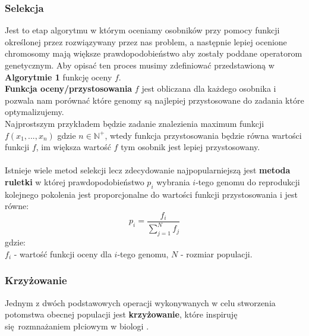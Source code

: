 \documentclass{article}
\begin{document}
\subsubsection{Selekcja}
Jest to etap algorytmu w którym oceniamy osobników przy pomocy funkcji określonej przez
rozwiązywany przez nas problem, a następnie lepiej ocenione chromosomy mają większe 
prawdopodobieństwo aby zostały poddane operatorom genetycznym.
Aby opisać ten proces musimy zdefiniować przedstawioną w \textbf{Algorytmie 1} funkcję oceny 
$f$.\\
\textbf{Funkcja oceny/przystosowania} $f$ jest obliczana dla każdego osobnika i pozwala nam
porównać które genomy są najlepiej przystosowane do zadania które optymalizujemy.\\
Najprostszym przykładem będzie zadanie znalezienia maximum funkcji 
$f(x_1, ..., x_n)$ gdzie $n \in \mathbb{N}^{+}$, wtedy funkcja przystosowania
będzie równa wartości funkcji $f$, im większa wartość $f$ tym osobnik jest
lepiej przystosowany.\\\\
Istnieje wiele metod selekcji lecz zdecydowanie najpopularniejszą jest \textbf{metoda ruletki}
w której prawdopodobieństwo $p_i$
wybrania $i$-tego genomu do reprodukcji kolejnego pokolenia jest proporcjonalne do wartości
funkcji przystosowania i jest równe:
\begin{equation}
	p_i = \frac{f_i}{\sum_{j=1}^{N} f_j}
\end{equation}
gdzie:\\
$f_i$ - wartość funkcji oceny dla $i$-tego genomu, $N$ - rozmiar populacji.\\

\subsubsection{Krzyżowanie}
Jednym z dwóch podstawowych operacji wykonywanych w celu stworzenia potomstwa obecnej populacji
jest \textbf{krzyżowanie}, które inspiruję się rozmnażaniem płciowym w biologi \cite{cross}.
\end{document}
